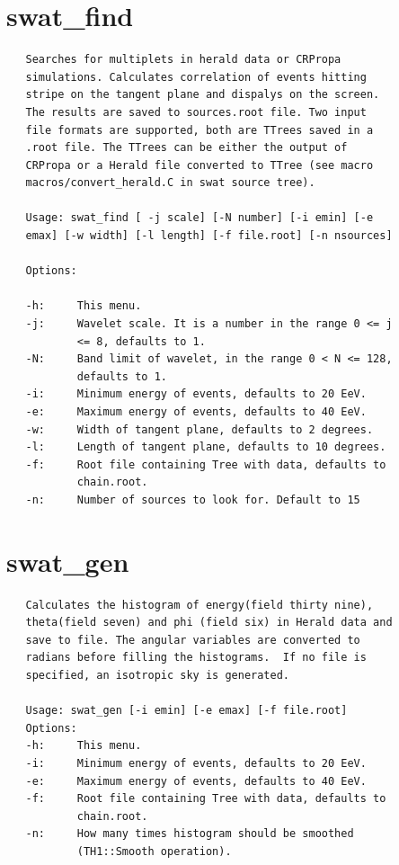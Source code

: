 \documentclass[12pt]{article}
\begin{document}
\section{swat\_find}
{\bf \color{brown}
   \begin{lstlisting}
   Searches for multiplets in herald data or CRPropa
   simulations. Calculates correlation of events hitting
   stripe on the tangent plane and dispalys on the screen.
   The results are saved to sources.root file. Two input
   file formats are supported, both are TTrees saved in a
   .root file. The TTrees can be either the output of
   CRPropa or a Herald file converted to TTree (see macro
   macros/convert_herald.C in swat source tree).
   
   Usage: swat_find [ -j scale] [-N number] [-i emin] [-e
   emax] [-w width] [-l length] [-f file.root] [-n nsources]
   
   Options:
   
   -h:     This menu.
   -j:     Wavelet scale. It is a number in the range 0 <= j
           <= 8, defaults to 1.
   -N:     Band limit of wavelet, in the range 0 < N <= 128,
           defaults to 1.
   -i:     Minimum energy of events, defaults to 20 EeV.
   -e:     Maximum energy of events, defaults to 40 EeV.
   -w:     Width of tangent plane, defaults to 2 degrees.
   -l:     Length of tangent plane, defaults to 10 degrees.
   -f:     Root file containing Tree with data, defaults to
           chain.root.
   -n:     Number of sources to look for. Default to 15
   \end{lstlisting}
}
\section{swat\_gen}
{\bf \color{brown}
   \begin{lstlisting}
   Calculates the histogram of energy(field thirty nine),
   theta(field seven) and phi (field six) in Herald data and
   save to file. The angular variables are converted to
   radians before filling the histograms.  If no file is
   specified, an isotropic sky is generated.

   Usage: swat_gen [-i emin] [-e emax] [-f file.root]
   Options:
   -h:     This menu.
   -i:     Minimum energy of events, defaults to 20 EeV.
   -e:     Maximum energy of events, defaults to 40 EeV.
   -f:     Root file containing Tree with data, defaults to
           chain.root.
   -n:     How many times histogram should be smoothed
           (TH1::Smooth operation).
   \end{lstlisting}
}
\newpage
\end{document}
